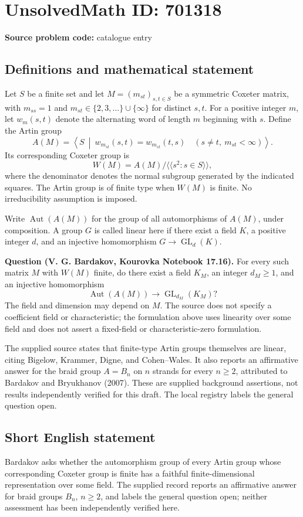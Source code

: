\documentclass[11pt]{article}
\begin{document}
\section*{UnsolvedMath ID: 701318}
\textbf{Source problem code:} catalogue entry
\subsection{Definitions and mathematical statement}
Let \(S\) be a finite set and let \(M=(m_{st})_{s,t\in S}\) be a symmetric Coxeter matrix, with \(m_{ss}=1\) and \(m_{st}\in\{2,3,\ldots\}\cup\{\infty\}\) for distinct \(s,t\). For a positive integer \(m\), let \(w_m(s,t)\) denote the alternating word of length \(m\) beginning with \(s\). Define the Artin group
\[
A(M)=\left\langle S\ \middle|\ w_{m_{st}}(s,t)=w_{m_{st}}(t,s)\quad(s\ne t,\ m_{st}<\infty)\right\rangle.
\]
Its corresponding Coxeter group is
\[
W(M)=A(M)/\langle\!\langle s^2:s\in S\rangle\!\rangle,
\]
where the denominator denotes the normal subgroup generated by the indicated squares. The Artin group is of finite type when \(W(M)\) is finite. No irreducibility assumption is imposed.

Write \(\operatorname{Aut}(A(M))\) for the group of all automorphisms of \(A(M)\), under composition. A group \(G\) is called linear here if there exist a field \(K\), a positive integer \(d\), and an injective homomorphism \(G\to\operatorname{GL}_d(K)\).

\textbf{Question (V. G. Bardakov, Kourovka Notebook 17.16).} For every such matrix \(M\) with \(W(M)\) finite, do there exist a field \(K_M\), an integer \(d_M\geq1\), and an injective homomorphism
\[
\operatorname{Aut}(A(M))\longrightarrow\operatorname{GL}_{d_M}(K_M)?
\]
The field and dimension may depend on \(M\). The source does not specify a coefficient field or characteristic; the formulation above uses linearity over some field and does not assert a fixed-field or characteristic-zero formulation.

The supplied source states that finite-type Artin groups themselves are linear, citing Bigelow, Krammer, Digne, and Cohen--Wales. It also reports an affirmative answer for the braid group \(A=B_n\) on \(n\) strands for every \(n\geq2\), attributed to Bardakov and Bryukhanov (2007). These are supplied background assertions, not results independently verified for this draft. The local registry labels the general question open.
\subsection{Short English statement}
Bardakov asks whether the automorphism group of every Artin group whose corresponding Coxeter group is finite has a faithful finite-dimensional representation over some field. The supplied record reports an affirmative answer for braid groups \(B_n\), \(n\geq2\), and labels the general question open; neither assessment has been independently verified here.
\end{document}
